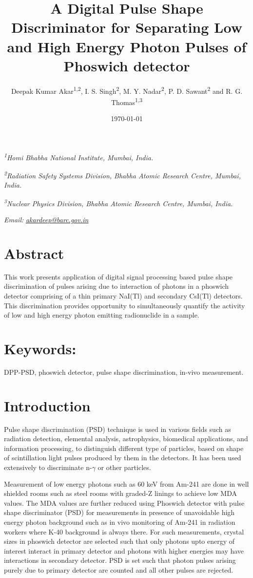 \documentclass[10pt]{article}
\title{ A Digital Pulse Shape Discriminator for Separating Low and High Energy Photon Pulses of Phoswich detector}
\author{Deepak Kumar Akar\textsuperscript{1,2}, I. S. Singh\textsuperscript{2}, M. Y. Nadar\textsuperscript{2}, P. D. Sawant\textsuperscript{2} and R. G. Thomas\textsuperscript{1,3}}
\date{\today}
\begin{document}
\maketitle

\textsuperscript{\textit{1}}\textit{Homi Bhabha National Institute, Mumbai, India.}

\textsuperscript{\textit{2}}\textit{Radiation Safety Systems Division, Bhabha Atomic Research Centre, Mumbai, India.}

\textsuperscript{\textit{3}}\textit{Nuclear Physics Division, Bhabha Atomic Research Centre, Mumbai, India. } 

 \textit{Email: }\href{mailto:akardeep@barc.gov.in}{\textit{akardeep@barc.gov.in}}

\section*{Abstract}

This work presents application of digital signal processing based pulse shape discrimination of pulses arising due to interaction of photons in a phoswich detector comprising of a thin primary NaI(Tl) and secondary CsI(Tl) detectors. This discrimination provides opportunity to simultaneously quantify the activity of low and high energy photon emitting radionuclide in a sample.

\section*{Keywords:} DPP-PSD, phoswich detector, pulse shape discrimination, in-vivo measurement.  

\section*{Introduction}

Pulse shape discrimination (PSD) technique is used in various fields such as radiation detection, elemental analysis, astrophysics, biomedical applications, and information processing, to distinguish different type of particles, based on shape of scintillation light pulses produced by them in the detectors. It has been used extensively to discriminate n-$\gamma$ or other particles.

Measurement of low energy photons such as 60 keV from Am-241 are done in well shielded rooms such as steel rooms with graded-Z linings to achieve low MDA values. The MDA values are further reduced using Phoswich detector with pulse shape discriminator (PSD) for measurements in presence of unavoidable high energy photon background such as in vivo monitoring of Am-241 in radiation workers where K-40 background is always there. For such measurements, crystal sizes in phoswich detector are selected such that only photons upto energy of interest interact in primary detector and photons with higher energies may have interactions in secondary detector. PSD is set such that photon pulses arising purely due to primary detector are counted and all other pulses are rejected. 
\end{document}

